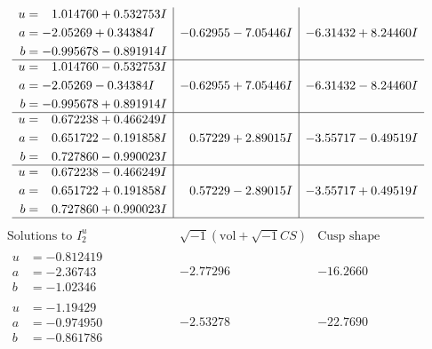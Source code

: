 \documentclass[1p]{elsarticle_modified}
\theoremstyle{definition}
\newcommand{\I}{\sqrt{-1}}
\begin{document}
$$\begin{array}{c|c|c}
\begin{aligned}
u &= \phantom{-}1.014760 + 0.532753 I \\
a &= -2.05269 + 0.34384 I \\
b &= -0.995678 - 0.891914 I\end{aligned}
 & -0.62955 - 7.05446 I & -6.31432 + 8.24460 I \\ \hline\begin{aligned}
u &= \phantom{-}1.014760 - 0.532753 I \\
a &= -2.05269 - 0.34384 I \\
b &= -0.995678 + 0.891914 I\end{aligned}
 & -0.62955 + 7.05446 I & -6.31432 - 8.24460 I \\ \hline\begin{aligned}
u &= \phantom{-}0.672238 + 0.466249 I \\
a &= \phantom{-}0.651722 - 0.191858 I \\
b &= \phantom{-}0.727860 - 0.990023 I\end{aligned}
 & \phantom{-}0.57229 + 2.89015 I & -3.55717 - 0.49519 I \\ \hline\begin{aligned}
u &= \phantom{-}0.672238 - 0.466249 I \\
a &= \phantom{-}0.651722 + 0.191858 I \\
b &= \phantom{-}0.727860 + 0.990023 I\end{aligned}
 & \phantom{-}0.57229 - 2.89015 I & -3.55717 + 0.49519 I\\
 \hline 
 \end{array}$$\newpage$$\begin{array}{c|c|c}  
\text{Solutions to }I^u_{2}& \I (\text{vol} + \sqrt{-1}CS) & \text{Cusp shape}\\
 \hline 
\begin{aligned}
u &= -0.812419\phantom{ +0.000000I} \\
a &= -2.36743\phantom{ +0.000000I} \\
b &= -1.02346\phantom{ +0.000000I}\end{aligned}
 & -2.77296\phantom{ +0.000000I} & -16.2660\phantom{ +0.000000I} \\ \hline\begin{aligned}
u &= -1.19429\phantom{ +0.000000I} \\
a &= -0.974950\phantom{ +0.000000I} \\
b &= -0.861786\phantom{ +0.000000I}\end{aligned}
 & -2.53278\phantom{ +0.000000I} & -22.7690\phantom{ +0.000000I} \\ \hline\begin{aligned}

\end{aligned}
\end{array}$$
\end{document}
